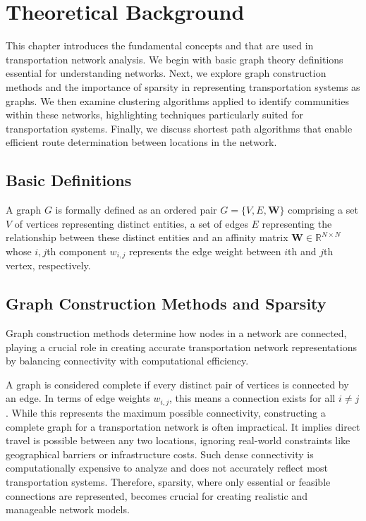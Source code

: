 \chapter{Theoretical Background}
\label{ch:basics}
This chapter introduces the fundamental concepts and that are used in transportation network analysis. We begin with basic graph theory definitions essential for understanding networks. Next, we explore graph construction methods and the importance of sparsity in representing transportation systems as graphs. We then examine clustering algorithms applied to identify communities within these networks, highlighting techniques particularly suited for transportation systems. Finally, we discuss shortest path algorithms that enable efficient route determination between locations in the network.
\section{Basic Definitions}
\label{se:BasicDefinitions}

A graph $G$ is formally defined as an ordered pair $G = \{V, E, \mathbf{W}\}$ comprising a set $V$ of vertices representing distinct entities, a set of edges $E$ representing the relationship between these distinct entities and an affinity matrix $\mathbf{W}\in\mathbb{R}^{N\times N}$ whose $i,j$th component $w_{i,j}$ represents the edge weight between $i$th and $j$th vertex, respectively.


\section{Graph Construction Methods and Sparsity}
\label{se:GraphConstructionMethodsAndSparsity}

Graph construction methods determine how nodes in a network are connected, playing a crucial role in creating accurate transportation network representations by balancing connectivity with computational efficiency.

A graph is considered complete if every distinct pair of vertices is connected by an edge. In terms of edge weights \(w_{i,j}\), this means a connection exists for all \(i \neq j\). While this represents the maximum possible connectivity, constructing a complete graph for a transportation network is often impractical. It implies direct travel is possible between any two locations, ignoring real-world constraints like geographical barriers or infrastructure costs. Such dense connectivity is computationally expensive to analyze and does not accurately reflect most transportation systems. Therefore, sparsity, where only essential or feasible connections are represented, becomes crucial for creating realistic and manageable network models.

